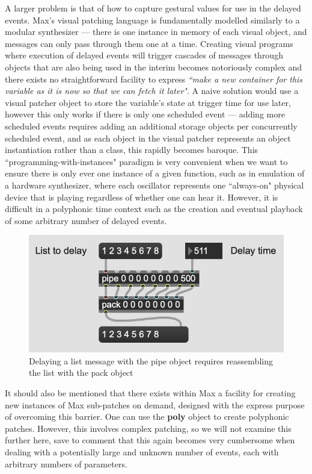 \documentclass[acmsmall]{acmart}
\begin{document}
A larger problem is that of how to capture gestural values for use in the delayed
events. Max's visual patching language is fundamentally modelled similarly to a modular
synthesizer --- there is one instance in memory of each visual object, and messages can only
pass through them one at a time. Creating visual programs where execution of 
delayed events will trigger cascades of messages through objects that are also 
being used in the interim becomes notoriously complex and there exists no straightforward
facility to express \textit{``make a new container for this variable as it is now so that
we can fetch it later"}. A naive solution would use a visual patcher object to store 
the variable's state at trigger time for use later, however this only works
if there is only one scheduled event --- adding more scheduled events requires adding
an additional storage objects per concurrently scheduled event, and as each object in the visual patcher
represents an object instantiation rather than a class, this rapidly becomes
baroque. This ``programming-with-instances" paradigm
is very convenient when we want to ensure there is only ever one instance of a given function, such
as in emulation of a hardware synthesizer, where each oscillator represents one ``always-on"
physical device that is playing regardless of whether one can hear it. 
However, it is difficult in a polyphonic time context
such as the creation and eventual playback of some arbitrary number of delayed events.

\begin{figure}[H]
  \centering
  \includegraphics[width=.5\linewidth]{fig-5-pipe}
  \caption{Delaying a list message with the pipe object requires reassembling the list with the pack object}
\end{figure}

It should also be mentioned that there exists within Max a facility for creating
new instances of Max sub-patches on demand, designed with the express purpose of
overcoming this barrier. One can use the \textbf{poly} object to create polyphonic
patches. However, this involves complex patching, so we will not examine this further here,
save to comment that this again becomes very cumbersome when dealing
with a potentially large and unknown number of events, each with arbitrary numbers
of parameters.
\end{document}
